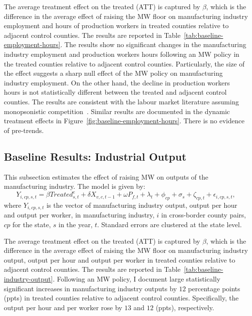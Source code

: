 \documentclass[12pt, english]{article}
\begin{document}
    The average treatment effect on the treated (ATT) is captured by $\beta$, which is the difference in the average effect of raising the MW floor on manufacturing industry employment and hours of production workers in treated counties relative to adjacent control counties. The results are reported in Table~\ref{tab:baseline-employment-hours}. The results show no significant changes in the manufacturing industry employment and production workers hours following an MW policy in the treated counties relative to adjacent control counties. Particularly, the size of the effect suggests a sharp null effect of the MW policy on manufacturing industry employment. On the other hand, the decline in production workers hours is not statistically different between the treated and adjacent control counties. The results are consistent with the labour market literature assuming monopsonistic competition~\parencite{card2000minimum, aaronson2018industry, cengiz2019effect, wong2019minimum, dustmann2022reallocation}. Similar results are documented in the dynamic treatment effects in Figure~\ref{fig:baseline-employment-hours}. There is no evidence of pre-trends.
    

    \subsection{Baseline Results: Industrial Output}\label{subsec:baseline-results-industrial-output}
    This subsection estimates the effect of raising MW on outputs of the manufacturing industry. The model is given by:
    \begin{equation}
        Y_{i,cp,s,t} = \beta Treated_{s,t}^e + \delta X_{v,c,t-1} + \omega P_{f,t} + \lambda_{t} + \phi_{cp} + \sigma_{s} + \zeta_{cp,t} + \epsilon_{i,cp,s,t},\label{eq:baseline-output}
    \end{equation}
    where $Y_{i,cp,s,t}$ is the vector of manufacturing industry output, output per hour and output per worker, in manufacturing industry, $i$ in cross-border county pairs, $cp$ for the state, $s$ in the year, $t$. Standard errors are clustered at the state level.
    

    The average treatment effect on the treated (ATT) is captured by $\beta$, which is the difference in the average effect of raising the MW floor on manufacturing industry output, output per hour and output per worker in treated counties relative to adjacent control counties. The results are reported in Table~\ref{tab:baseline-industry-output}. Following an MW policy, I document large statistically significant increases in manufacturing industry outputs by $12$ percentage points (ppts) in treated counties relative to adjacent control counties. Specifically, the output per hour and per worker rose by $13$ and $12$ (ppts), respectively.
\end{document}
